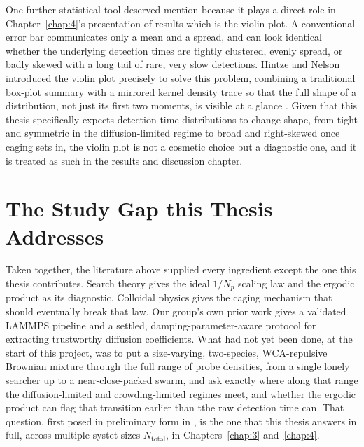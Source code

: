 \hspace{\parindent} One further statistical tool deserved mention because it plays a direct role in Chapter~\ref{chap:4}'s presentation of results which is the violin plot. A conventional error bar communicates only a mean and a spread, and can look identical whether the underlying detection times are tightly clustered, evenly spread, or badly skewed with a long tail of rare, very slow detections. Hintze and Nelson introduced the violin plot precisely to solve this problem, combining a traditional box-plot summary with a mirrored kernel density trace so that the full shape of a distribution, not just its first two moments, is visible at a glance \cite{Hintze1998}. Given that this thesis specifically expects detection time distributions to change shape, from tight and symmetric in the diffusion-limited regime to broad and right-skewed once caging sets in, the violin plot is not a cosmetic choice but a diagnostic one, and it is treated as such in the results and discussion chapter.

\section{The Study Gap this Thesis Addresses}
\label{sec:2.6}
\hspace{\parindent} Taken together, the literature above supplied every ingredient except the one this thesis contributes. Search theory gives the ideal $1/N_p$ scaling law and the ergodic product as its diagnostic. Colloidal physics gives the caging mechanism that should eventually break that law. Our group's own prior work gives a validated LAMMPS pipeline and a settled, damping-parameter-aware protocol for extracting trustworthy diffusion coefficients. What had not yet been done, at the start of this project, was to put a size-varying, two-species, WCA-repulsive Brownian mixture through the full range of probe densities, from a single lonely searcher up to a near-close-packed swarm, and ask exactly where along that range the diffusion-limited and crowding-limited regimes meet, and whether the ergodic product can flag that transition earlier than tthe raw detection time can. That question, first posed in preliminary form in \cite{Balejado2026}, is the one that this thesis answers in full, across multiple systet sizes $N_\text{total}$, in Chapters~\ref{chap:3} and~\ref{chap:4}.